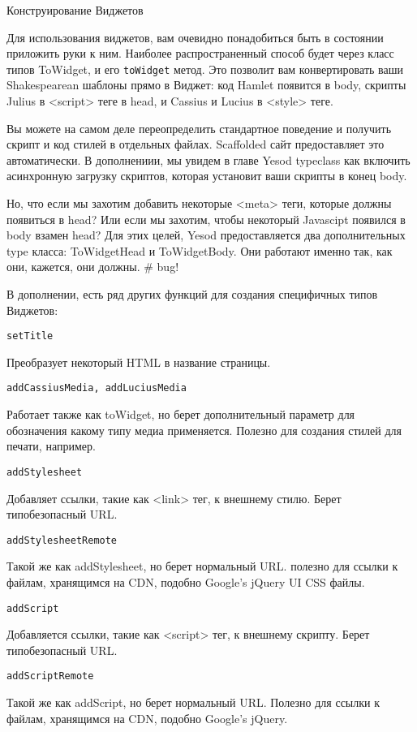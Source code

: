 Конструирование Виджетов

Для использования виджетов, вам очевидно понадобиться быть в состоянии приложить руки к ним. Наиболее распространенный способ будет через класс типов ToWidget, и его \lstinline'toWidget' метод. Это позволит вам конвертировать ваши Shakespearean шаблоны прямо в Виджет: код Hamlet появится в body, скрипты Julius в <script> теге в head, и Cassius и Lucius в <style> теге.

Вы можете на самом деле переопределить стандартное поведение и получить скрипт и код стилей в отдельных файлах. Scaffolded сайт предоставляет это автоматически. В дополнениии, мы увидем в главе Yesod typeclass как включить асинхронную загрузку скриптов, которая установит ваши скрипты в конец body.

Но, что если мы захотим добавить некоторые <meta> теги, которые должны появиться в head? Или если мы захотим, чтобы некоторый Javascipt появился в body взамен head? Для этих целей, Yesod предоставляется два дополнительных type класса: ToWidgetHead и ToWidgetBody. Они работают именно так, как они, кажется, они должны. # bug!

В дополнении, есть ряд других функций для создания специфичных типов Виджетов:

\lstinline'setTitle'

Преобразует некоторый HTML в название страницы.

\lstinline'addCassiusMedia, addLuciusMedia'

Работает также как toWidget, но берет дополнительный параметр для обозначения какому типу медиа применяется. Полезно для создания стилей для печати, например.

\lstinline'addStylesheet'

Добавляет ссылки, такие как <link> тег, к внешнему стилю. Берет типобезопасный URL.

\lstinline'addStylesheetRemote'

Такой же как addStylesheet, но берет нормальный URL. полезно для ссылки к файлам, хранящимся на CDN, подобно Google's jQuery UI CSS файлы.

\lstinline'addScript'

Добавляется ссылки, такие как <script> тег, к внешнему скрипту. Берет типобезопасный URL. 

\lstinline'addScriptRemote'

Такой же как addScript, но берет нормальный URL. Полезно для ссылки к файлам, хранящимся на CDN, подобно Google's jQuery.

